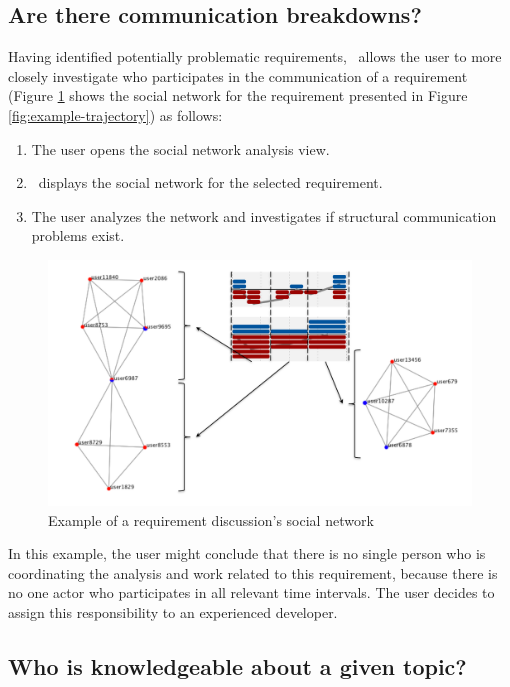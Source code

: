 \subsection{Are there communication breakdowns?}
Having identified potentially problematic requirements, \viss\  allows the user to more closely investigate who participates in the communication of a requirement (Figure \ref{fig:example-sn} shows the social network for the requirement presented in Figure \ref{fig:example-trajectory}) as follows:
\begin{enumerate}
\item The user opens the social network analysis view.
\item \viss\ displays the social network for the selected requirement.
\item The user analyzes the network and investigates if structural communication problems exist.
\end{enumerate}

\begin{figure}
\centering
\includegraphics[width=0.8\columnwidth]{img/example-sn}
\caption{Example of a requirement discussion's social network}
\label{fig:example-sn}
\end{figure}

In this example, the user might conclude that there is no single person who is coordinating the analysis and work related to this requirement, because there is no one actor who participates in all relevant time intervals.
The user decides to assign this responsibility to an experienced developer.

\subsection{Who is knowledgeable about a given topic?}

